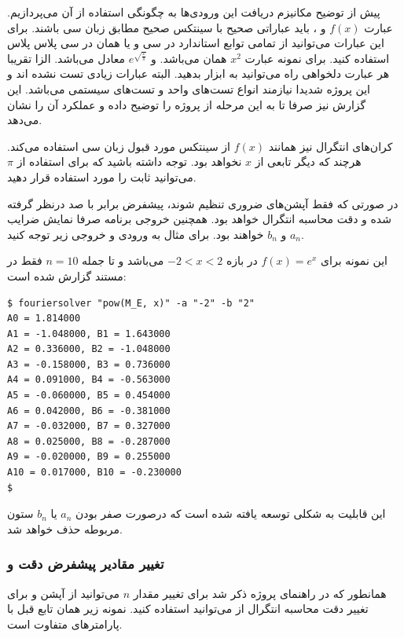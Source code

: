 \documentclass[a4paper]{report}
\begin{document}
پیش از توضیح مکانیزم دریافت این ورودی‌ها به چگونگی استفاده از آن می‌پردازیم. عبارت $f(x)$ و  ، باید عباراتی صحیح
با سینتکس صحیح مطابق زبان سی باشند. برای این عبارات می‌توانید از تمامی توابع استاندارد  در سی و یا همان 
در سی پلاس پلاس استفاده کنید. برای نمونه عبارت
$x^2$
همان
می‌باشد. و
$e^{\sqrt{\frac{x}{\pi}}}$
معادل
می‌باشد. الزا تقریبا هر عبارت دلخواهی راه می‌توانید به ابزار بدهید. البته عبارات زیادی تست نشده اند و این پروژه شدیدا نیازمند
انواع تست‌های واحد
و تست‌های سیستمی
می‌باشد. این گزارش نیز صرفا تا به این مرحله از پروژه را توضیح داده و عملکرد آن را نشان می‌دهد.

کران‌های انتگرال نیز همانند $f(x)$ از سینتکس مورد قبول زبان سی استفاده می‌کند. هرچند که دیگر تابعی از $x$ نخواهد بود.
توجه داشته باشید که برای استفاده از $\pi$ می‌توانید ثابت  را مورد استفاده قرار دهید.

در صورتی که فقط آپشن‌های ضروری تنظیم شوند، پیشفرض  برابر با صد درنظر گرفته شده و دقت محاسبه انتگرال  خواهد بود.
همچنین خروجی برنامه صرفا نمایش ضرایب $a_n$ و $b_n$  خواهند بود. برای مثال به ورودی و خروجی زیر توجه کنید.

این نمونه
برای
$f(x) = e^x$
در بازه
$-2 < x < 2$
می‌باشد و تا جمله
$n=10$
فقط در مستند گزارش شده است:

\begin{latin}
\begin{verbatim}
$ fouriersolver "pow(M_E, x)" -a "-2" -b "2"
A0 = 1.814000
A1 = -1.048000, B1 = 1.643000
A2 = 0.336000, B2 = -1.048000
A3 = -0.158000, B3 = 0.736000
A4 = 0.091000, B4 = -0.563000
A5 = -0.060000, B5 = 0.454000
A6 = 0.042000, B6 = -0.381000
A7 = -0.032000, B7 = 0.327000
A8 = 0.025000, B8 = -0.287000
A9 = -0.020000, B9 = 0.255000
A10 = 0.017000, B10 = -0.230000
$
\end{verbatim}
\end{latin}

این قابلیت به شکلی توسعه یافته شده است که درصورت صفر بودن $a_n$ یا $b_n$ ستون مربوطه حذف خواهد شد.

\subsubsection{تغییر مقادیر پیشفرض دقت و }

همانطور که در راهنمای پروژه ذکر شد برای تغییر مقدار $n$ می‌توانید از آپشن  و برای تغییر دقت محاسبه انتگرال
از  می‌توانید استفاده کنید. نمونه زیر همان تابع قبل با پارامترهای متفاوت است.
\end{document}
